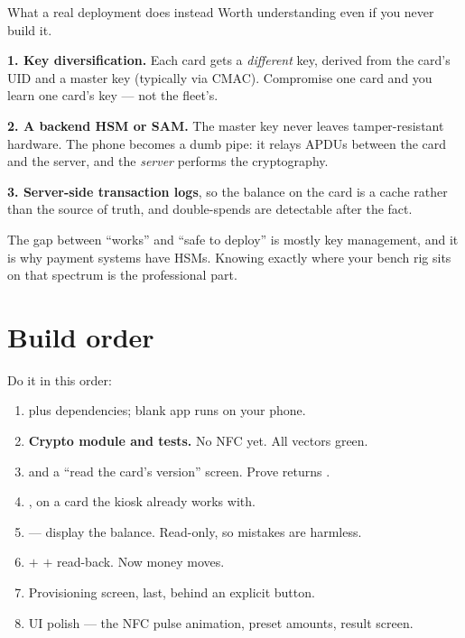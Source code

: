\begin{concept}{What a real deployment does instead}
Worth understanding even if you never build it.

\textbf{1. Key diversification.} Each card gets a \emph{different} key, derived
from the card's UID and a master key (typically via CMAC). Compromise one card
and you learn one card's key --- not the fleet's.

\textbf{2. A backend HSM or SAM.} The master key never leaves tamper-resistant
hardware. The phone becomes a dumb pipe: it relays APDUs between the card and the
server, and the \emph{server} performs the cryptography.

\textbf{3. Server-side transaction logs}, so the balance on the card is a cache
rather than the source of truth, and double-spends are detectable after the fact.

The gap between ``works'' and ``safe to deploy'' is mostly key management, and it
is why payment systems have HSMs. Knowing exactly where your bench rig sits on
that spectrum is the professional part.
\end{concept}

\section{Build order}

Do it in this order:

\begin{enumerate}
  \item {} plus dependencies; blank app runs on your phone.
  \item \textbf{Crypto module and tests.} No NFC yet. All vectors green.
  \item {} and a ``read the card's version'' screen. Prove
         returns .
  \item {}, on a card the kiosk already works with.
  \item {} --- display the balance. Read-only, so mistakes are harmless.
  \item {} $+$  $+$ read-back. Now money moves.
  \item Provisioning screen, last, behind an explicit button.
  \item UI polish --- the NFC pulse animation, preset amounts, result screen.
\end{enumerate}

